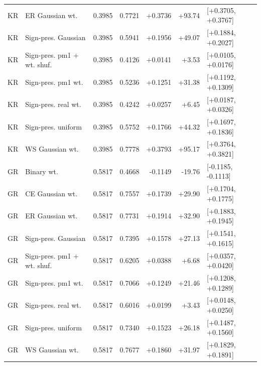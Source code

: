 \begin{tabular}{llrrrrl}
KR & ER Gaussian wt. & 0.3985 & 0.7721 & +0.3736 & +93.74 & [+0.3705, +0.3767] \\
KR & Sign-pres. Gaussian & 0.3985 & 0.5941 & +0.1956 & +49.07 & [+0.1884, +0.2027] \\
KR & Sign-pres. pm1 + wt. shuf. & 0.3985 & 0.4126 & +0.0141 & +3.53 & [+0.0105, +0.0176] \\
KR & Sign-pres. pm1 wt. & 0.3985 & 0.5236 & +0.1251 & +31.38 & [+0.1192, +0.1309] \\
KR & Sign-pres. real wt. & 0.3985 & 0.4242 & +0.0257 & +6.45 & [+0.0187, +0.0326] \\
KR & Sign-pres. uniform & 0.3985 & 0.5752 & +0.1766 & +44.32 & [+0.1697, +0.1836] \\
KR & WS Gaussian wt. & 0.3985 & 0.7778 & +0.3793 & +95.17 & [+0.3764, +0.3821] \\
GR & Binary wt. & 0.5817 & 0.4668 & -0.1149 & -19.76 & [-0.1185, -0.1113] \\
GR & CE Gaussian wt. & 0.5817 & 0.7557 & +0.1739 & +29.90 & [+0.1704, +0.1775] \\
GR & ER Gaussian wt. & 0.5817 & 0.7731 & +0.1914 & +32.90 & [+0.1883, +0.1945] \\
GR & Sign-pres. Gaussian & 0.5817 & 0.7395 & +0.1578 & +27.13 & [+0.1541, +0.1615] \\
GR & Sign-pres. pm1 + wt. shuf. & 0.5817 & 0.6205 & +0.0388 & +6.68 & [+0.0357, +0.0420] \\
GR & Sign-pres. pm1 wt. & 0.5817 & 0.7066 & +0.1249 & +21.46 & [+0.1208, +0.1289] \\
GR & Sign-pres. real wt. & 0.5817 & 0.6016 & +0.0199 & +3.43 & [+0.0148, +0.0250] \\
GR & Sign-pres. uniform & 0.5817 & 0.7340 & +0.1523 & +26.18 & [+0.1487, +0.1560] \\
GR & WS Gaussian wt. & 0.5817 & 0.7677 & +0.1860 & +31.97 & [+0.1829, +0.1891] \\
\bottomrule
\end{tabular}

